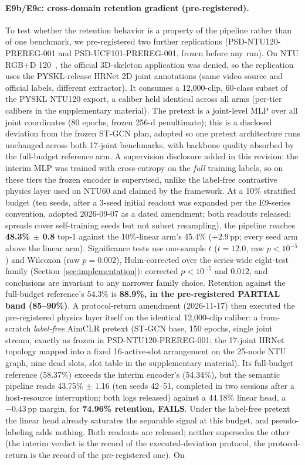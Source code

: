 \paragraph{E9b/E9c: cross-domain retention gradient (pre-registered).}
To test whether the retention behavior is a property of the pipeline rather than of one benchmark, we pre-registered two further replications (PSD-NTU120-PREREG-001 and PSD-UCF101-PREREG-001, frozen before any run). On NTU RGB+D 120~\citep{liu2020ntu}, the official 3D-skeleton application was denied, so the replication uses the PYSKL-release HRNet 2D joint annotations (same video source and official labels, different extractor). It consumes a 12{,}000-clip, 60-class subset of the PYSKL NTU120 export, a caliber held identical across all arms (per-tier calibers in the supplementary material). The pretext is a joint-level MLP over all joint coordinates (80 epochs, frozen 256-d penultimate); this is a disclosed deviation from the frozen ST-GCN plan, adopted so one pretext architecture runs unchanged across both 17-joint benchmarks, with backbone quality absorbed by the full-budget reference arm. A supervision disclosure added in this revision: the interim MLP was trained with cross-entropy on the \emph{full} training labels, so on these tiers the frozen encoder is supervised, unlike the label-free contrastive physics layer used on NTU60 and claimed by the framework. At a 10\% stratified budget (ten seeds, after a 3-seed initial readout was expanded per the E9-series convention, adopted 2026-09-07 as a dated amendment; both readouts released; spreads cover self-training seeds but not subset resampling), the pipeline reaches \textbf{48.3\% $\pm$ 0.8} top-1 against the 10\%-linear arm's 45.4\% ($+2.9$\,pp; every seed arm above the linear arm). Significance tests use one-sample $t$ ($t{=}12.0$, raw $p<10^{-5}$) and Wilcoxon (raw $p=0.002$), Holm-corrected over the series-wide eight-test family (Section~\ref{sec:implementation}): corrected $p<10^{-5}$ and $0.012$, and conclusions are invariant to any narrower family choice. Retention against the full-budget reference's 54.3\% is \textbf{88.9\%, in the pre-registered PARTIAL band (85--90\%)}. A protocol-return amendment (2026-11-17) then executed the pre-registered physics layer itself on the identical 12{,}000-clip caliber: a from-scratch \emph{label-free} AimCLR pretext (ST-GCN base, 150 epochs, single joint stream, exactly as frozen in PSD-NTU120-PREREG-001; the 17-joint HRNet topology mapped into a fixed 16-active-slot arrangement on the 25-node NTU graph, nine dead slots, slot table in the supplementary material). Its full-budget reference (58.37\%) exceeds the interim encoder's (54.34\%), but the semantic pipeline reads 43.75\% $\pm$ 1.16 (ten seeds 42--51, completed in two sessions after a host-resource interruption; both logs released) against a 44.18\% linear head, a $-0.43$\,pp margin, for \textbf{74.96\% retention, FAILS}. Under the label-free pretext the linear head already saturates the separable signal at this budget, and pseudo-labeling adds nothing. Both readouts are released; neither supersedes the other (the interim verdict is the record of the executed-deviation protocol, the protocol-return is the record of the pre-registered one). On 